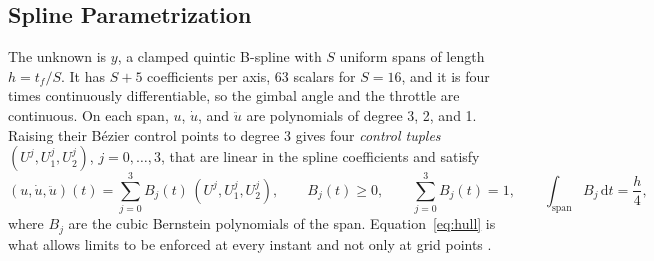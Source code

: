 \documentclass[10pt,letterpaper]{article}
\theoremstyle{aiaa}
\begin{document}
\subsection{Spline Parametrization}
The unknown is $y$, a clamped quintic B-spline with $S$ uniform spans of length $h=t_f/S$. It has $S+5$ coefficients per axis,
63 scalars for $S=16$, and it is four times continuously differentiable, so the gimbal angle and the throttle are continuous.
On each span, $u$, $\dot u$, and $\ddot u$ are polynomials of degree 3, 2, and 1. Raising their B\'ezier control points to
degree 3 gives four \emph{control tuples} $(U^j,U_1^j,U_2^j)$, $j=0,\dots,3$, that are linear in the spline coefficients and satisfy
\begin{equation}\label{eq:hull}
(u,\dot u,\ddot u)(t)=\sum_{j=0}^{3}B_j(t)\,(U^j,U_1^j,U_2^j),\qquad B_j(t)\ge0,\qquad \sum_{j=0}^{3}B_j(t)=1,\qquad \int_{\mathrm{span}}B_j\,\mathrm dt=\frac h4 ,
\end{equation}
where $B_j$ are the cubic Bernstein polynomials of the span. Equation~\eqref{eq:hull} is what allows limits to be enforced at
every instant and not only at grid points \cite{vanloock2015}.
\end{document}
